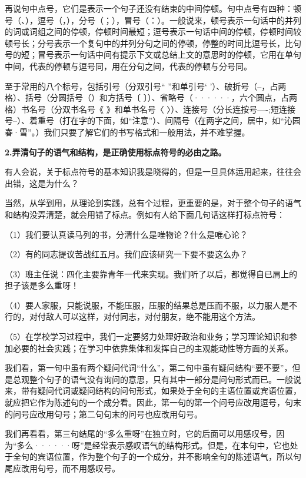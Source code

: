 再说句中点号，它们是表示一个句子还没有结束的中间停顿。句中点号有四种：顿号（、），逗号（，），分号（；），冒号（：）。一般说来，顿号表示一句话中的并列的词或词组之间的停顿，停顿时间最短；逗号表示一句话中间的停顿，停顿时间较顿号长；分号表示一个复句中的并列分句之间的停顿，停整的时间比逗号长，比句号的短；冒号表示一句话中间有提示下文或总结上文的意思时的停顿，它用在单句中间，代表的停顿与逗号同，用在分句之间，代表的停顿与分号同。

至于常用的八个标号，包括引号（分双引号“ ”和单引号‘ ’）、破折号（--，占两格）、括号（分圆括号（）和方括号〔 〕）、省略号（······，六个圆点，占两格）书名号（分双书名号《 》和单书名号〈 〉）、连接号（分长连按号----;短连接号--）、着重号（打在字的下面，如“注意”）、间隔号（在两字之间，居中，如“沁园春·雪”。）我们只要了解它们的书写格式和一般用法，并不难掌握。

\textbf{2.弄清句子的语气和结构，是正确使用标点符号的必由之路。}

有人会说，关于标点符号的基本知识我是晓得的，但是一旦具体运用起来，往往会出错，这是为什么？

当然，从学到用，从理论到实践，总有个过程，更重要的是，对于整个句子的语气和结构没弄清楚，就会用错了标点。例如有人给下面几句话这样打标点符号：

（1）我们要认真读马列的书，分清什么是唯物论？什么是唯心论？

（2）有的同志提议苦战红五月。我们应该研究一下要不要这么办？

（3）班主任说：四化主要靠青年一代来实现。我们听了以后，都觉得自已肩上的担子该是多么重呀！

（4）要人家服，只能说服，不能压服，压服的结果总是压而不服，以力服人是不行的，对付敌人可以这样，对付同志，对付朋友，绝不能用这个方法。

（5）在学校学习过程中，我们一定要努力处理好政治和业务；学习理论知识和参加必要的社会实践；在学习中依靠集体和发挥自己的主观能动性等方面的关系。

我们看，第一句中虽有两个疑问代词“什么”，第二句中虽有疑问结构“要不要”，但是总观整个句子的语气没有询问的意思，只有其中一部分是问句形式而已。一般说来，带有疑问代词或疑问结构的问句形式，如果处于全句的主语位置或宾语位置，就应把它作为陈述句的一个成分看。因此，第一句的第一个问号应改用逗号，句末的问号应改用句号；第二句句末的问号也应改用句号。

我们再看看，第三句结尾的“多么重呀”在独立时，它的后面可以用感叹号，因为“多么······呀”是经常表示感叹语气的结构形式。但是，在本句中，它也处于全句的宾语位置，作为整个句子的一个成分，并不影响全句的陈述语气，所以句尾应改用句号，而不用感叹号。

